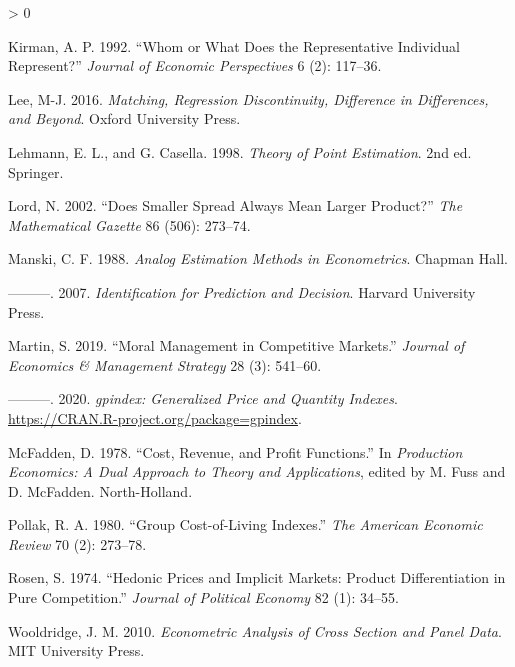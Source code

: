 \documentclass[
]{article}
\newlength{\cslhangindent}
\newenvironment{CSLReferences}[2] %
 {%
  \setlength{\parindent}{0pt}
  \ifodd #1 \everypar{\setlength{\hangindent}{\cslhangindent}}\ignorespaces\fi
  \ifnum #2 > 0
  \setlength{\parskip}{#2\baselineskip}
  \fi
 }%
 {}
\begin{document}
\begin{CSLReferences}{1}{0}
\leavevmode\hypertarget{ref-kirman1992}{}%
Kirman, A. P. 1992. {``Whom or What Does the Representative Individual Represent?''} \emph{Journal of Economic Perspectives} 6 (2): 117--36.

\leavevmode\hypertarget{ref-lee2016}{}%
Lee, M-J. 2016. \emph{Matching, Regression Discontinuity, Difference in Differences, and Beyond}. Oxford University Press.

\leavevmode\hypertarget{ref-lehmann1998}{}%
Lehmann, E. L., and G. Casella. 1998. \emph{Theory of Point Estimation}. 2nd ed. Springer.

\leavevmode\hypertarget{ref-lord2002}{}%
Lord, N. 2002. {``Does Smaller Spread Always Mean Larger Product?''} \emph{The Mathematical Gazette} 86 (506): 273--74.

\leavevmode\hypertarget{ref-manski1988}{}%
Manski, C. F. 1988. \emph{Analog Estimation Methods in Econometrics}. Chapman Hall.

\leavevmode\hypertarget{ref-manski2007}{}%
---------. 2007. \emph{Identification for Prediction and Decision}. Harvard University Press.

\leavevmode\hypertarget{ref-martin2019}{}%
Martin, S. 2019. {``Moral Management in Competitive Markets.''} \emph{Journal of Economics \& Management Strategy} 28 (3): 541--60.

\leavevmode\hypertarget{ref-martin2020}{}%
---------. 2020. \emph{{gpindex}: Generalized Price and Quantity Indexes}. \url{https://CRAN.R-project.org/package=gpindex}.

\leavevmode\hypertarget{ref-mcfadden1978}{}%
McFadden, D. 1978. {``Cost, Revenue, and Profit Functions.''} In \emph{Production Economics: A Dual Approach to Theory and Applications}, edited by M. Fuss and D. McFadden. North-Holland.

\leavevmode\hypertarget{ref-pollak1980}{}%
Pollak, R. A. 1980. {``Group Cost-of-Living Indexes.''} \emph{The American Economic Review} 70 (2): 273--78.

\leavevmode\hypertarget{ref-rosen1974}{}%
Rosen, S. 1974. {``Hedonic Prices and Implicit Markets: Product Differentiation in Pure Competition.''} \emph{Journal of Political Economy} 82 (1): 34--55.

\leavevmode\hypertarget{ref-wooldridge2010}{}%
Wooldridge, J. M. 2010. \emph{Econometric Analysis of Cross Section and Panel Data}. MIT University Press.

\end{CSLReferences}
\end{document}
